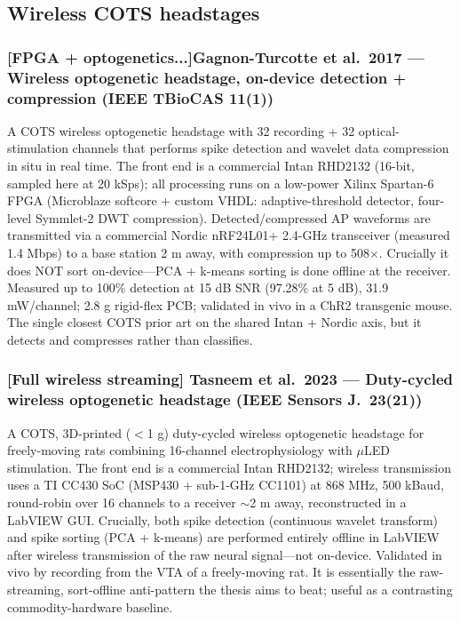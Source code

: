 \documentclass[11pt]{article}
\begin{document}
\subsection*{Wireless COTS headstages}

\subsubsection*{[FPGA + optogenetics...]Gagnon-Turcotte et al.\ 2017 --- Wireless optogenetic headstage, on-device detection + compression (IEEE TBioCAS 11(1))}
A COTS wireless optogenetic headstage with 32 recording + 32 optical-stimulation channels that performs spike detection and wavelet data compression in situ in real time. The front end is a commercial Intan RHD2132 (16-bit, sampled here at 20 kSps); all processing runs on a low-power Xilinx Spartan-6 FPGA (Microblaze softcore + custom VHDL: adaptive-threshold detector, four-level Symmlet-2 DWT compression). Detected/compressed AP waveforms are transmitted via a commercial Nordic nRF24L01+ 2.4-GHz transceiver (measured 1.4 Mbps) to a base station 2 m away, with compression up to 508$\times$. Crucially it does NOT sort on-device---PCA + k-means sorting is done offline at the receiver. Measured up to 100\% detection at 15 dB SNR (97.28\% at 5 dB), 31.9 mW/channel; 2.8 g rigid-flex PCB; validated in vivo in a ChR2 transgenic mouse. The single closest COTS prior art on the shared Intan + Nordic axis, but it detects and compresses rather than classifies.


\subsubsection*{[Full wireless streaming] Tasneem et al.\ 2023 --- Duty-cycled wireless optogenetic headstage (IEEE Sensors J.\ 23(21))}
A COTS, 3D-printed ($<$1 g) duty-cycled wireless optogenetic headstage for freely-moving rats combining 16-channel electrophysiology with $\mu$LED stimulation. The front end is a commercial Intan RHD2132; wireless transmission uses a TI CC430 SoC (MSP430 + sub-1-GHz CC1101) at 868 MHz, 500 kBaud, round-robin over 16 channels to a receiver $\sim$2 m away, reconstructed in a LabVIEW GUI. Crucially, both spike detection (continuous wavelet transform) and spike sorting (PCA + k-means) are performed entirely offline in LabVIEW after wireless transmission of the raw neural signal---not on-device. Validated in vivo by recording from the VTA of a freely-moving rat. It is essentially the raw-streaming, sort-offline anti-pattern the thesis aims to beat; useful as a contrasting commodity-hardware baseline.
\end{document}
